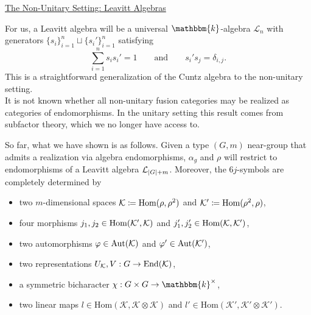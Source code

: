 \documentclass{beamer}
\DeclarePairedDelimiter{\abs}{\lvert}{\rvert}
\newcommand{\homset}{\mathrm{Hom}}
\begin{document}
\begin{frame}
\noindent\centerline{\LARGE\textcolor{structure}{\underline{The Non-Unitary Setting: Leavitt Algebras}}}
\end{frame}

\begin{frame}
For us, a \textcolor{structure}{Leavitt algebra} will be a universal $\mathbbm{k}$-algebra $\mathcal{L}_n$ with generators $\{s_i\}_{i=1}^n \sqcup \{s_i'\}_{i=1}^n$ satisfying
\[
\sum_{i=1}^n s_is_i' = 1\qquad\text{and}\qquad s_i's_j = \delta_{i,j}.
\]
This is a straightforward generalization of the Cuntz algebra to the non-unitary setting.\\[2ex]

It is \textcolor{structure}{not known} whether all non-unitary fusion categories may be realized as categories of endomorphisms. In the unitary setting this result comes from subfactor theory, which we no longer have access to.
\end{frame}

\begin{frame}
So far, what we have shown is as follows. Given a type $(G, m)$ near-group that admits a realization via algebra endomorphisms, $\alpha_g$ and $\rho$ will restrict to endomorphisms of a Leavitt algebra $\mathcal{L}_{\abs{G}+m}$. Moreover, the $6j$-symbols are completely determined by\\[1.5ex]
\begin{itemize}
\item two $m$-dimensional spaces $\mathcal{K} \coloneqq \textup{Hom}(\rho, \rho^2)$ \textcolor{structure}{and $\mathcal{K}' \coloneqq \textup{Hom}(\rho^2, \rho)$},\\[2ex]
\item four morphisms $j_1, j_2 \in \textup{Hom}(\mathcal{K}', \mathcal{K})$ \textcolor{structure}{and $j_1', j_2' \in \textup{Hom}(\mathcal{K}, \mathcal{K}')$},\\[2ex]
\item \textcolor{structure}{two automorphisms $\varphi \in \textup{Aut}(\mathcal{K})$ and $\varphi' \in \textup{Aut}(\mathcal{K}')$},\\[2ex]
\item two representations $U_\mathcal{K}, V : G \to \textup{End}(\mathcal{K})$,\\[2ex]
\item a symmetric bicharacter $\chi : G \times G \to \mathbbm{k}^\times$,\\[2ex]
\item two linear maps $l \in \homset(\mathcal{K}, \mathcal{K} \otimes \mathcal{K})$ \textcolor{structure}{and $l' \in \homset(\mathcal{K}', \mathcal{K}' \otimes \mathcal{K}')$}.
\end{itemize}
\end{frame}
\end{document}
